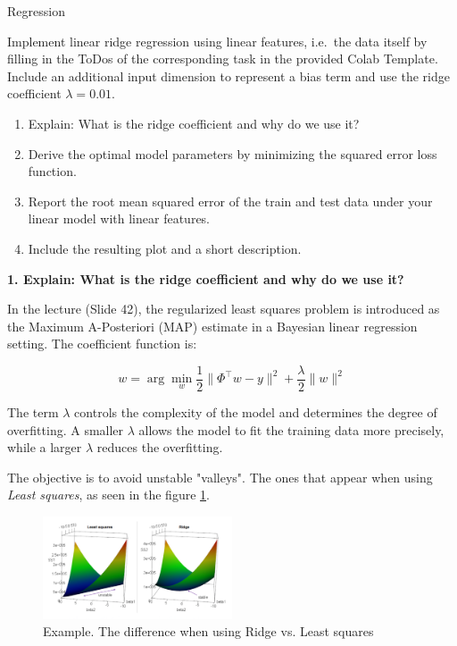 \documentclass[
	english,
        solution=true
	]{tudaexercise}
\begin{document}
\begin{task}[points=34]{Regression}
    \begin{subtask}[points=8, title=Linear Features]
        Implement linear ridge regression using linear features, i.e.~the data itself by filling in the ToDos of the corresponding task in the provided Colab Template.
        Include an additional input dimension to represent a bias term and use the ridge coefficient $\lambda = 0.01$.
        
        \begin{enumerate}
            \item Explain: What is the ridge coefficient and why do we use it? 
            \item Derive the optimal model parameters by minimizing the squared error loss function. 
            \item Report the root mean squared error of the train and test data under your linear model with linear features. 
            \item Include the resulting plot and a short description. 
        \end{enumerate}

        \begin{solution}
            \textbf{1. Explain: What is the ridge coefficient and why do we use it?}

            In the lecture (Slide 42), the regularized least squares problem is introduced as the Maximum A-Posteriori (MAP) estimate in a Bayesian linear regression setting.
            The coefficient function is:

            \[
            w = \arg\min_w \frac{1}{2} \|\Phi^\top w - y\|^2 + \frac{\lambda}{2} \|w\|^2
            \]


            The term $\lambda$ controls the complexity of the model and determines the degree of overfitting.
            A smaller $\lambda$ allows the model to fit the training data more precisely, while a larger $\lambda$ reduces the overfitting.

            The objective is to avoid unstable "valleys".
            The ones that appear when using \textit{Least squares}, as seen in the figure \ref{Task1a_1}.

            \begin{figure}[H]
                \centering
                \includegraphics[width=0.5\textwidth]{images/Task1a_1.png}
                \caption{Example. The difference when using Ridge vs. Least squares}
                \label{Task1a_1}
            \end{figure}
            

\end{solution}
\end{subtask}
\end{task}
\end{document}
